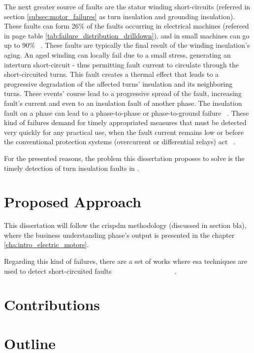 The next greater source of faults are the stator winding short-circuits (referred in section \ref{subsec:motor_failures} as turn insulation and grounding insulation). These faults can form 26\% of the faults occurring in electrical machines (refereed in page \pageref{tab:failure_distribution_drilldown} table \ref{tab:failure_distribution_drilldown}), and in small machines can go up to 90\% ~\cite{Riera-Guasp2015}. These faults are typically the final result of the winding insulation's aging. An aged winding can locally fail due to a small stress, generating an interturn short-circuit - thus permitting fault current to circulate through the short-circuited turns. This fault creates a thermal effect that leads to a progressive degradation of the affected turns' insulation and its neighboring turns. These events' course lead to a progressive spread of the fault, increasing fault's current and even to an insulation fault of another phase. The insulation fault on a phase can lead to a phase-to-phase or phase-to-ground failure ~\cite{Riera-Guasp2015}. These kind of failures demand for timely appropriated measures that must be detected very quickly for any practical use, when the fault current remains low or before the conventional protection systems (overcurrent or differential relays) act ~\cite{Riera-Guasp2015}.

For the presented reasons, the problem this dissertation proposes to solve is the timely detection of turn insulation faults in .





\section{Proposed Approach} %
\label{sec:proposed_approach}

This dissertation will follow the \acrlong{crispdm} methodology (discussed in section bla), where the business understanding phase's output is presented in the chapter \ref{cha:intro_electric_motors}.

Regarding this kind of failures, there are a set of works where \Acrshort{esa} techniques are used to detect short-circuited faults ~\cite{Ourici2012} ~\cite{Cheng2011} ~\cite{Joksimovic2013} ~\cite{Cruz2001} ~\cite{Cabanas2013} ~\cite{Gandhi2011} ~\cite{Kia2013} ~\cite{M.a2014} ~\cite{Bouzid2013} ~\cite{Bakhri2012} ~\cite{Bakhri2012}.






\section{Contributions} %
\label{sec:contributions}

\section{Outline} %
\label{sec:outline}

